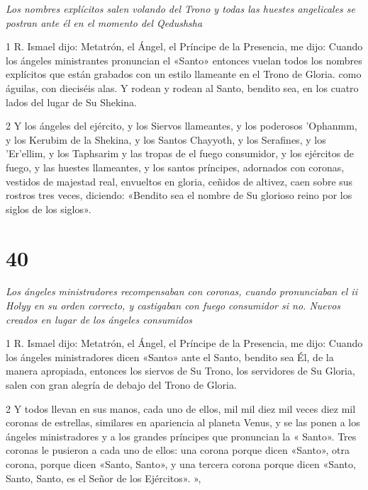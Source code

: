 \par \textit{Los nombres explícitos salen volando del Trono y todas las huestes angelicales se postran ante él en el momento del Qedushsha}

\par 1 R. Ismael dijo: Metatrón, el Ángel, el Príncipe de la Presencia, me dijo: Cuando los ángeles ministrantes pronuncian el «Santo» entonces vuelan todos los nombres explícitos que están grabados con un estilo llameante en el Trono de Gloria. como águilas, con dieciséis alas. Y rodean y rodean al Santo, bendito sea, en los cuatro lados del lugar de Su Shekina.

\par 2 Y los ángeles del ejército, y los Siervos llameantes, y los poderosos 'Ophanmm, y los Kerubim de la Shekina, y los Santos Chayyoth, y los Serafines, y los 'Er'ellim, y los Taphsarim y las tropas de el fuego consumidor, y los ejércitos de fuego, y las huestes llameantes, y los santos príncipes, adornados con coronas, vestidos de majestad real, envueltos en gloria, ceñidos de altivez, caen sobre sus rostros tres veces, diciendo: «Bendito sea el nombre de Su glorioso reino por los siglos de los siglos».


\chapter{40}

\par \textit{Los ángeles ministradores recompensaban con coronas, cuando pronunciaban el ii Holyy en su orden correcto, y castigaban con fuego consumidor si no. Nuevos creados en lugar de los ángeles consumidos}

\par 1 R. Ismael dijo: Metatrón, el Ángel, el Príncipe de la Presencia, me dijo: Cuando los ángeles ministradores dicen «Santo» ante el Santo, bendito sea Él, de la manera apropiada, entonces los siervos de Su Trono, los servidores de Su Gloria, salen con gran alegría de debajo del Trono de Gloria.

\par 2 Y todos llevan en sus manos, cada uno de ellos, mil mil diez mil veces diez mil coronas de estrellas, similares en apariencia al planeta Venus, y se las ponen a los ángeles ministradores y a los grandes príncipes que pronuncian la « Santo». Tres coronas le pusieron a cada uno de ellos: una corona porque dicen «Santo», otra corona, porque dicen «Santo, Santo», y una tercera corona porque dicen «Santo, Santo, Santo, es el Señor de los Ejércitos». »,

